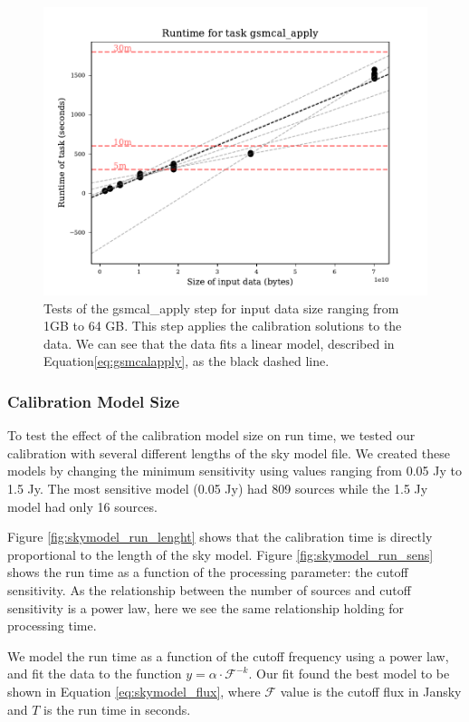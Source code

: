 \documentclass[preprint,5p]{elsarticle}
\begin{document}
\begin{figure}
    \includegraphics[width=0.95\linewidth]{figures/gsmcal_apply_size.pdf}
      \cprotect\caption{Tests of the {\selectfont gsmcal\_apply} step for input data size ranging from 1GB to 64 GB. This step applies the calibration solutions to the data. We can see that the data fits a linear model, described in Equation\ref{eq:gsmcalapply}, as the black dashed line.}
	\label{fig:gsmcalapply_size}
\end{figure}

\subsubsection{Calibration Model Size}
To test the effect of the calibration model size on run time, we tested our calibration with several different lengths of the sky model file. We created these models by changing the minimum sensitivity using values ranging from 0.05 Jy to 1.5 Jy. The most sensitive model (0.05 Jy) had 809 sources while the 1.5 Jy model had only 16 sources. 

Figure \ref{fig:skymodel_run_lenght} shows that the calibration time is directly proportional to the length of the sky model. Figure \ref{fig:skymodel_run_sens} shows the run time as a function of the processing parameter: the cutoff sensitivity. As the relationship between the number of sources and cutoff sensitivity is a power law, here we see the same relationship holding for processing time.

We model the run time as a function of the cutoff frequency using a power law, and fit the data to the function $y=\alpha\cdot \mathcal{F}^{-k}$. Our fit found the best model to be shown in Equation \ref{eq:skymodel_flux}, where $\mathcal{F}$ value is the cutoff flux in Jansky and $T$ is the run time in seconds. 
\end{document}
